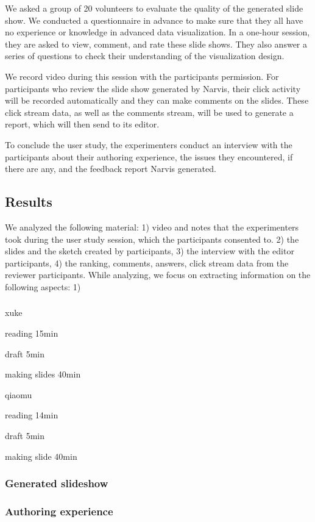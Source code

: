 We asked a group of 20 volunteers to evaluate the quality of the generated slide show. We conducted a questionnaire in advance to make sure that they all have no experience or knowledge in advanced data visualization. In a one-hour session, they are asked to view, comment, and rate these slide shows. They also answer a series of questions to check their understanding of the visualization design. \par 
We record video during this session with the participants permission. For participants who review the slide show generated by Narvis, their click activity will be recorded automatically and they can make comments on the slides. These click stream data, as well as the comments stream, will be used to generate a report, which will then send to its editor. \par
To conclude the user study, the experimenters conduct an interview with the participants about their authoring experience, the issues they encountered, if there are any, and the feedback report Narvis generated. \par
\subsection{Results}
We analyzed the following material: 1) video and notes that the experimenters took during the user study session, which the participants consented to. 2) the slides and the sketch created by participants, 3) the interview with the editor participants, 4) the ranking, comments, answers, click stream data from the reviewer participants. While analyzing, we focus on extracting information on the following aspects: 1)
\subsubsection{}
\subsubsection{}
xuke\par
reading 15min\par
draft 5min \par
making slides 40min \par
qiaomu\par
reading 14min\par
draft 5min\par
making slide 40min\par
\subsubsection{Generated slideshow}
\subsubsection{Authoring experience}